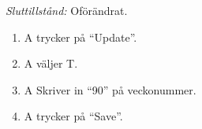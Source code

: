 \documentclass[a4paper]{article}
\begin{document}
\begin{FT}
\emph{Sluttillstånd:} Oförändrat.

\begin{enumerate}
 \item A trycker på ``Update''.
 \item A väljer T.
 \item A Skriver in ``90'' på veckonummer.
 \item A trycker på ``Save''.
\end{enumerate}

% 
% 
% 
% 
% 
% 
% 
% 
% 
% 
% 
% 
% 

\end{FT}
\end{document}
